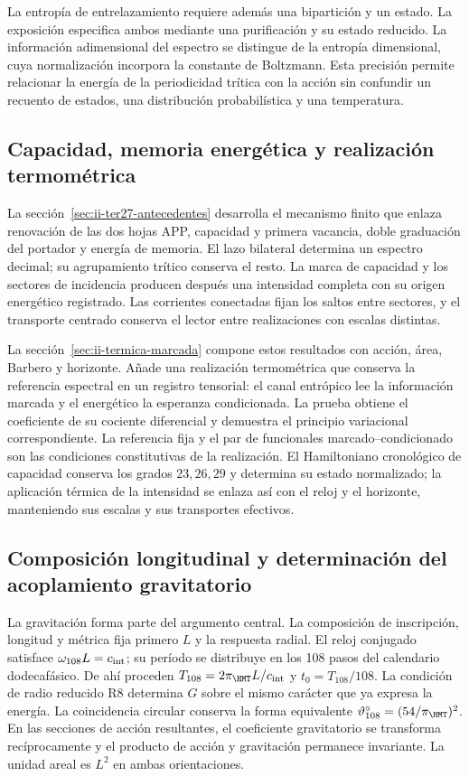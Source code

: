 La entropía de entrelazamiento requiere además una bipartición y un
estado. La exposición especifica ambos mediante una purificación y su
estado reducido. La información adimensional del espectro se distingue
de la entropía dimensional, cuya normalización incorpora la constante
de Boltzmann. Esta precisión permite relacionar la energía de la
periodicidad trítica con la acción sin confundir un recuento de estados,
una distribución probabilística y una temperatura.

\subsection{Capacidad, memoria energética y realización termométrica}

La sección~\ref{sec:ii-ter27-antecedentes} desarrolla el mecanismo finito
que enlaza renovación de las dos hojas APP, capacidad y primera vacancia,
doble graduación del portador y energía de memoria. El lazo bilateral
determina un espectro decimal; su agrupamiento trítico conserva el resto.
La marca de capacidad y los sectores de incidencia producen después
una intensidad completa con su origen energético registrado. Las corrientes
conectadas fijan los saltos entre sectores, y el transporte centrado
conserva el lector entre realizaciones con escalas distintas.

La sección~\ref{sec:ii-termica-marcada} compone estos resultados con
acción, área, Barbero y horizonte. Añade una realización termométrica
que conserva la referencia espectral en un registro tensorial: el canal
entrópico lee la información marcada y el energético la esperanza
condicionada. La prueba obtiene el coeficiente de su cociente diferencial
y demuestra el principio variacional correspondiente. La referencia fija
y el par de funcionales marcado--condicionado son las condiciones
constitutivas de la realización. El Hamiltoniano cronológico de capacidad
conserva los grados $23,26,29$ y determina su estado normalizado; la
aplicación térmica de la intensidad se enlaza así con el reloj y el horizonte,
manteniendo sus escalas y sus transportes efectivos.

\subsection{Composición longitudinal y determinación del acoplamiento gravitatorio}

La gravitación forma parte del argumento central. La composición de
inscripción, longitud y métrica fija primero \(L\) y la respuesta radial.
El reloj conjugado satisface \(\omega_{108}L=c_{\rm int}\); su período
se distribuye en los 108 pasos del calendario dodecafásico. De ahí
proceden \(T_{108}=2\pi_{\HMT}L/c_{\rm int}\) y
\(t_0=T_{108}/108\). La condición de radio reducido R8 determina
\(G\) sobre el mismo carácter que ya expresa la energía. La
coincidencia circular conserva la forma equivalente
\(\vartheta_{108}^{\circ}=(54/\pi_{\HMT})^2\). En las secciones
de acción resultantes, el coeficiente gravitatorio se transforma
recíprocamente y el producto de acción y gravitación permanece
invariante. La unidad areal es \(L^2\) en ambas orientaciones.

